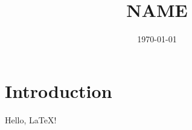 \documentclass{jsarticle}
\title{{{NAME}}}
\author{}
\date{\today}
\begin{document}
\maketitle

\section{Introduction}

Hello, LaTeX!
\end{document}
